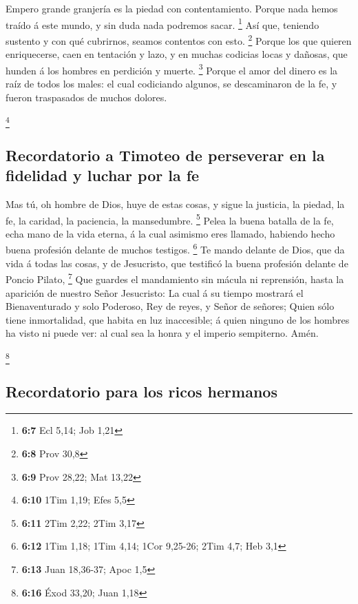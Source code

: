 Empero grande granjería es la piedad con contentamiento.
 Porque nada hemos traído á este mundo, y sin duda nada
podremos sacar. \footnote{\textbf{6:7} Ecl 5,14; Job 1,21} 
Así que, teniendo sustento y con qué cubrirnos, seamos contentos con
esto. \footnote{\textbf{6:8} Prov 30,8}  Porque los que
quieren enriquecerse, caen en tentación y lazo, y en muchas codicias
locas y dañosas, que hunden á los hombres en perdición y muerte.
\footnote{\textbf{6:9} Prov 28,22; Mat 13,22}  Porque el
amor del dinero es la raíz de todos los males: el cual codiciando
algunos, se descaminaron de la fe, y fueron traspasados de muchos
dolores.

\footnote{\textbf{6:10} 1Tim 1,19; Efes 5,5}

\hypertarget{recordatorio-a-timoteo-de-perseverar-en-la-fidelidad-y-luchar-por-la-fe}{%
\subsection{Recordatorio a Timoteo de perseverar en la fidelidad y
luchar por la
fe}\label{recordatorio-a-timoteo-de-perseverar-en-la-fidelidad-y-luchar-por-la-fe}}

 Mas tú, oh hombre de Dios, huye de estas cosas, y sigue la
justicia, la piedad, la fe, la caridad, la paciencia, la mansedumbre.
\footnote{\textbf{6:11} 2Tim 2,22; 2Tim 3,17}  Pelea la
buena batalla de la fe, echa mano de la vida eterna, á la cual asimismo
eres llamado, habiendo hecho buena profesión delante de muchos testigos.
\footnote{\textbf{6:12} 1Tim 1,18; 1Tim 4,14; 1Cor 9,25-26; 2Tim 4,7;
  Heb 3,1}  Te mando delante de Dios, que da vida á todas
las cosas, y de Jesucristo, que testificó la buena profesión delante de
Poncio Pilato, \footnote{\textbf{6:13} Juan 18,36-37; Apoc 1,5}
 Que guardes el mandamiento sin mácula ni reprensión, hasta
la aparición de nuestro Señor Jesucristo:  La cual á su
tiempo mostrará el Bienaventurado y solo Poderoso, Rey de reyes, y Señor
de señores;  Quien sólo tiene inmortalidad, que habita en
luz inaccesible; á quien ninguno de los hombres ha visto ni puede ver:
al cual sea la honra y el imperio sempiterno. Amén.

\footnote{\textbf{6:16} Éxod 33,20; Juan 1,18}

\hypertarget{recordatorio-para-los-ricos-hermanos}{%
\subsection{Recordatorio para los ricos
hermanos}\label{recordatorio-para-los-ricos-hermanos}}

